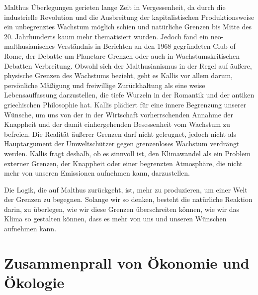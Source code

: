 \documentclass[
]{book}
\begin{document}
Malthus Überlegungen gerieten lange Zeit in Vergessenheit, da durch die industrielle Revolution und die Ausbreitung der kapitalistischen Produktionsweise ein unbegrenztes Wachstum möglich schien und natürliche Grenzen bis Mitte des 20. Jahrhunderts kaum mehr thematisiert wurden. Jedoch fand ein neo-malthusianisches Verständnis in Berichten an den 1968 gegründeten Club of Rome, der Debatte um Planetare Grenzen oder auch in Wachstumskritischen Debatten Verbreitung. Obwohl sich der Malthusianismus in der Regel auf äußere, physische Grenzen des Wachstums bezieht, geht es Kallis vor allem darum, persönliche Mäßigung und freiwillige Zurückhaltung als eine weise Lebensauffassung darzustellen, die tiefe Wurzeln in der Romantik und der antiken griechischen Philosophie hat. Kallis plädiert für eine innere Begrenzung unserer Wünsche, um uns von der in der Wirtschaft vorherrschenden Annahme der Knappheit und der damit einhergehenden Besessenheit vom Wachstum zu befreien. Die Realität äußerer Grenzen darf nicht geleugnet, jedoch nicht als Hauptargument der Umweltschützer gegen grenzenloses Wachstum verdrängt werden. Kallis fragt deshalb, ob es sinnvoll ist, den Klimawandel als ein Problem externer Grenzen, der Knappheit oder einer begrenzten Atmosphäre, die nicht mehr von unseren Emissionen aufnehmen kann, darzustellen.

Die Logik, die auf Malthus zurückgeht, ist, mehr zu produzieren, um einer Welt der Grenzen zu begegnen. Solange wir so denken, besteht die natürliche Reaktion darin, zu überlegen, wie wir diese Grenzen überschreiten können, wie wir das Klima so gestalten können, dass es mehr von uns und unseren Wünschen aufnehmen kann.

\hypertarget{zusammenprall-von-uxf6konomie-und-uxf6kologie}{%
\section{Zusammenprall von Ökonomie und Ökologie}\label{zusammenprall-von-uxf6konomie-und-uxf6kologie}}
\end{document}
